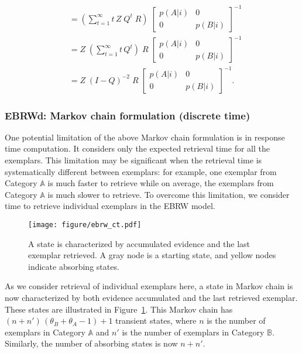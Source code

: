 \documentclass[doc]{apa6}
\begin{document}
\begin{align}
    [\mathcal{E}(n \vert \mathbb{A}), \; \mathcal{E}(n \vert \mathbb{B})]
        &= \left( \sum_{t=1}^{\infty} t \, Z \; Q^{t} \; R \right) \;
        {\left[ \begin{array}{cc} p(A \vert i) & 0 \\ 0 & p(B \vert i) \end{array} \right]}^{-1}\\
        &= Z \; \left( \sum_{t=1}^{\infty} t \, Q^{t} \right) \; R \;
        {\left[ \begin{array}{cc} p(A \vert i) & 0 \\ 0 & p(B \vert i) \end{array} \right]}^{-1}\\
        &= Z \; {(I - Q)}^{-2} \; R \;
        {\left[ \begin{array}{cc} p(A \vert i) & 0 \\ 0 & p(B \vert i) \end{array} \right]}^{-1}.
\end{align}


\subsubsection{EBRWd: Markov chain formulation (discrete time)}

One potential limitation of the above Markov chain formulation is in response time computation. It
considers only the expected retrieval time for all the exemplars. This limitation may be significant
when the retrieval time is systematically different between exemplars: for example, one exemplar
from Category $\mathbb{A}$ is much faster to retrieve while on average, the exemplars from Category
$\mathbb{A}$ is much slower to retrieve. To overcome this limitation, we consider time to retrieve
individual exemplars in the EBRW model.

\begin{figure}[t!]
    \centering
    \texttt{[image: figure/ebrw\_ct.pdf]}

    \vspace{10pt}

    \caption{A state is characterized by accumulated evidence and the last exemplar retrieved. A
    gray node is a starting state, and yellow nodes indicate absorbing states.}

\label{fig:ebrw_ct}
\end{figure}

As we consider retrieval of individual exemplars here, a state in Markov chain is now characterized
by both evidence accumulated and the last retrieved exemplar. These states are illustrated in
Figure~\ref{fig:ebrw_ct}. This Markov chain has $(n + n') \, (\theta_{B} + \theta_{A} - 1) + 1$
transient states, where $n$ is the number of exemplars in Category $\mathbb{A}$ and $n'$ is the
number of exemplars in Category $\mathbb{B}$.  Similarly, the number of absorbing states is now $n +
n'$.
\end{document}
